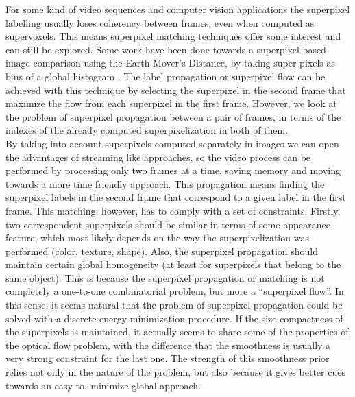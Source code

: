 For some kind of video sequences and computer vision
applications the superpixel labelling usually loses coherency between frames, 
even when computed as supervoxels. 
This means superpixel matching techniques offer some interest and can still be
explored. Some work have been done towards a
superpixel based image comparison using the Earth
Mover's Distance, by taking super pixels as bins of a
global histogram \cite{c2}. The label propagation or superpixel flow can be
achieved with this technique by selecting the superpixel in the second frame that maximize the flow
from each superpixel in the first frame.
However, we look at the problem of superpixel
propagation between a pair of frames, in terms of the
indexes of the already computed superpixelization in
both of them. \\
By taking into account superpixels computed separately in images we can open the advantages of
streaming like approaches, so the video process can be performed by processing only two frames at a time, 
saving memory and moving towards a more time friendly approach. This propagation means finding
the superpixel labels in the second frame that
correspond to a given label in the first frame. This
matching, however, has to comply with a set of
constraints. Firstly, two correspondent superpixels
should be similar in terms of some appearance
feature, which most likely depends on the way the
superpixelization was performed (color, texture,
shape). Also, the superpixel propagation should
maintain certain global homogeneity (at least for
superpixels that belong to the same object). This is
because the superpixel propagation or matching is
not completely a one-to-one combinatorial problem,
but more a “superpixel flow”. In this sense, it seems
natural that the problem of superpixel propagation
could be solved with a discrete energy minimization
procedure. If the size compactness of the superpixels is maintained, 
it actually seems to share some of the properties of the
optical flow problem, with the difference that the
smoothness is usually a very strong constraint for the
last one. The strength of this smoothness prior relies
not only in the nature of the problem, but also
because it gives better cues towards an easy-to-
minimize global approach.